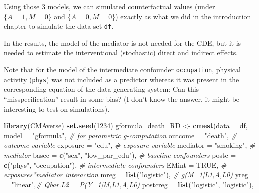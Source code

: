 \documentclass[
]{book}
\newenvironment{Shaded}{\begin{snugshade}}{\end{snugshade}}
\newcommand{\AttributeTok}[1]{\textcolor[rgb]{0.13,0.29,0.53}{#1}}
\newcommand{\CommentTok}[1]{\textcolor[rgb]{0.56,0.35,0.01}{\textit{#1}}}
\newcommand{\ConstantTok}[1]{\textcolor[rgb]{0.56,0.35,0.01}{#1}}
\newcommand{\DecValTok}[1]{\textcolor[rgb]{0.00,0.00,0.81}{#1}}
\newcommand{\FunctionTok}[1]{\textcolor[rgb]{0.13,0.29,0.53}{\textbf{#1}}}
\newcommand{\NormalTok}[1]{#1}
\newcommand{\OtherTok}[1]{\textcolor[rgb]{0.56,0.35,0.01}{#1}}
\newcommand{\StringTok}[1]{\textcolor[rgb]{0.31,0.60,0.02}{#1}}
\begin{document}
Using those 3 models, we can simulated counterfactual values (under \(\{A=1,M=0\}\) and \(\{A=0,M=0\}\)) exactly as what we did in the introduction chapter to simulate the data set \texttt{df}.

In the results, the model of the mediator is not needed for the CDE, but it is needed to estimate the interventional (stochastic) direct and indirect effects.

Note that for the model of the intermediate confounder \texttt{occupation}, physical activity (\texttt{phys}) was not included as a predictor whereas it was present in the corresponding equation of the data-generating system: Can this ``misspecification'' result in some bias? (I don't know the answer, it might be interesting to test on simulations).

\begin{Shaded}
\begin{Highlighting}[]
\FunctionTok{library}\NormalTok{(CMAverse)}
\FunctionTok{set.seed}\NormalTok{(}\DecValTok{1234}\NormalTok{)}
\NormalTok{gformula\_death\_RD }\OtherTok{\textless{}{-}} \FunctionTok{cmest}\NormalTok{(}\AttributeTok{data =}\NormalTok{ df, }
                           \AttributeTok{model =} \StringTok{"gformula"}\NormalTok{, }\CommentTok{\# for parametric g{-}computation}
                           \AttributeTok{outcome =} \StringTok{"death"}\NormalTok{, }\CommentTok{\# outcome variable}
                           \AttributeTok{exposure =} \StringTok{"edu"}\NormalTok{, }\CommentTok{\# exposure variable}
                           \AttributeTok{mediator =} \StringTok{"smoking"}\NormalTok{, }\CommentTok{\# mediator}
                           \AttributeTok{basec =} \FunctionTok{c}\NormalTok{(}\StringTok{"sex"}\NormalTok{,     }
                                     \StringTok{"low\_par\_edu"}\NormalTok{), }\CommentTok{\# baseline confounders}
                           \AttributeTok{postc =} \FunctionTok{c}\NormalTok{(}\StringTok{"phys"}\NormalTok{, }
                                     \StringTok{"occupation"}\NormalTok{), }\CommentTok{\# intermediate confounders }
                           \AttributeTok{EMint =} \ConstantTok{TRUE}\NormalTok{, }\CommentTok{\# exposures*mediator interaction}
                           \AttributeTok{mreg =} \FunctionTok{list}\NormalTok{(}\StringTok{"logistic"}\NormalTok{), }\CommentTok{\# g(M=1|L1,A,L0)}
                           \AttributeTok{yreg =} \StringTok{"linear"}\NormalTok{,}\CommentTok{\# Qbar.L2 = P(Y=1|M,L1,A,L0) }
                           \AttributeTok{postcreg =} \FunctionTok{list}\NormalTok{(}\StringTok{"logistic"}\NormalTok{, }\StringTok{"logistic"}\NormalTok{), }

\end{Highlighting}
\end{Shaded}
\end{document}
